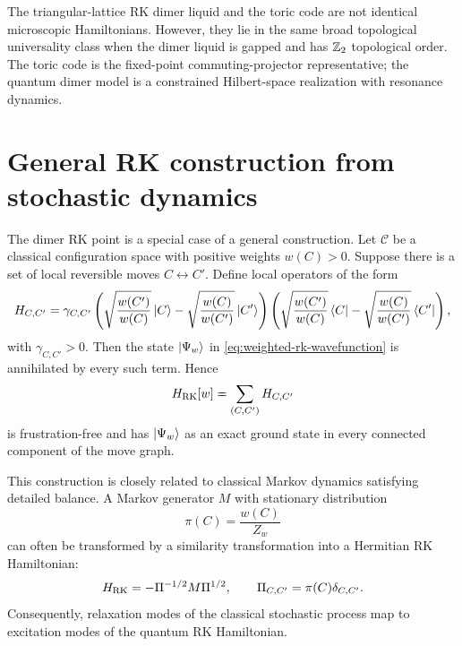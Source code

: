 \begin{remark}
The triangular-lattice RK dimer liquid and the toric code are not identical
microscopic Hamiltonians.  However, they lie in the same broad topological
universality class when the dimer liquid is gapped and has \(\mathbb{Z}_2\) topological
order.  The toric code is the fixed-point commuting-projector representative;
the quantum dimer model is a constrained Hilbert-space realization with
resonance dynamics.
\end{remark}

\section{General RK construction from stochastic dynamics}
\label{sec:general-rk-stochastic-construction}

The dimer RK point is a special case of a general construction.  Let
\(\mathcal{C}\) be a classical configuration space with positive weights
\(w(C)>0\).  Suppose there is a set of local reversible moves
\(C\leftrightarrow C'\).  Define local operators of the form
\begin{equation}
\label{eq:general-rk-local-projector}
    H_{C,C'}
    =
    \gamma_{C,C'}
    \left(
        \sqrt{\frac{w(C')}{w(C)}}\left|C\right\rangle
        -
        \sqrt{\frac{w(C)}{w(C')}}\left|C'\right\rangle
    \right)
    \left(
        \sqrt{\frac{w(C')}{w(C)}}\left\langle C\right|
        -
        \sqrt{\frac{w(C)}{w(C')}}\left\langle C'\right|
    \right),
\end{equation}
with \(\gamma_{C,C'}>0\).  Then the state \(\left|\Psi_w\right\rangle\) in
\cref{eq:weighted-rk-wavefunction} is annihilated by every such term.  Hence
\begin{equation}
\label{eq:general-rk-hamiltonian}
    H_{\rm RK}[w]
    =
    \sum_{(C,C')}H_{C,C'}
\end{equation}
is frustration-free and has \(\left|\Psi_w\right\rangle\) as an exact ground state in every
connected component of the move graph.

This construction is closely related to classical Markov dynamics satisfying
detailed balance.  A Markov generator \(M\) with stationary distribution
\begin{equation}
\label{eq:rk-stationary-distribution}
    \pi(C)=\frac{w(C)}{Z_w}
\end{equation}
can often be transformed by a similarity transformation into a Hermitian RK
Hamiltonian:
\begin{equation}
\label{eq:markov-to-rk-similarity}
    H_{\rm RK}
    =
    -\Pi^{-1/2}M\Pi^{1/2},
    \qquad
    \Pi_{C,C'}=\pi(C)\delta_{C,C'} .
\end{equation}
Consequently, relaxation modes of the classical stochastic process map to
excitation modes of the quantum RK Hamiltonian.

